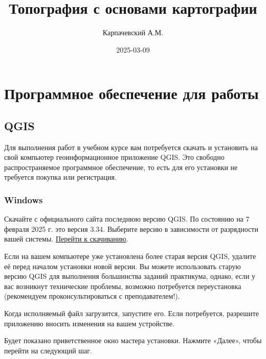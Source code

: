 \documentclass[
  12pt,
]{book}
\title{Топография с основами картографии}
\author{Карпачевский А.М.}
\date{2025-03-09}
\begin{document}
\maketitle

{
\hypersetup{linkcolor=}
\setcounter{tocdepth}{1}
\tableofcontents
}
\chapter*{Программное обеспечение для работы}\label{ux43fux440ux43eux433ux440ux430ux43cux43cux43dux43eux435-ux43eux431ux435ux441ux43fux435ux447ux435ux43dux438ux435-ux434ux43bux44f-ux440ux430ux431ux43eux442ux44b}

\section*{QGIS}\label{qgis}

Для выполнения работ в учебном курсе вам потребуется скачать и установить на свой компьютер геоинформационное приложение QGIS. Это свободно распространяемое программное обеспечение, то есть для его установки не требуется покупка или регистрация.

\subsection*{Windows}\label{windows}

Скачайте с официального сайта последнюю версию QGIS. По состоянию на 7 февраля 2025 г. это версия 3.34. Выберите версию в зависимости от разрядности вашей системы. \href{https://download.osgeo.org/qgis/windows/QGIS-OSGeo4W-3.34.15-1.msi}{Перейти к скачиванию}.

Если на вашем компьютере уже установлена более старая версия QGIS, удалите её перед началом установки новой версии. Вы можете использовать старую версию QGIS для выполнения большинства заданий практикума, однако, если у вас возникнут технические проблемы, возможно потребуется переустановка (рекомендуем проконсультироваться с преподавателем!).

Когда исполняемый файл загрузится, запустите его. Если потребуется, разрешите приложению вносить изменения на вашем устройстве.

Будет показано приветственное окно мастера установки. Нажмите «Далее», чтобы перейти на следующий шаг.
\end{document}
